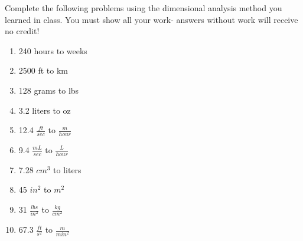 \documentclass[12pt]{article} %
\date{}
\begin{document}
\thispagestyle{fancy}
\noindent
Complete the following problems using the dimensional analysis method you learned in class. You must show all your work- answers without work will receive no credit!
\begin{enumerate}
\item 240 hours to weeks
\vspace{1.5in}
\item 2500 ft to km
\vspace{1.5in}
\item 128 grams to lbs
\vspace{1.5in}
\item 3.2 liters to oz
\vspace{1.5in}
\item 12.4 $\frac{ft}{sec}$ to $\frac{m}{hour}$
\vspace{1.5in}
\item 9.4 $\frac{mL}{sec}$ to $\frac{L}{hour}$
\vspace{1.5in}
\item 7.28 $cm^3$ to liters
\vspace{1.5in}
\item 45 $in^2$ to $m^2$
\vspace{1.5in}
\item 31 $\frac{lbs}{in^2}$ to $\frac{kg}{cm^2}$
\vspace{1.5in}
\item 67.3 $\frac{ft}{s^2}$ to $\frac{m}{min^2}$
\end{enumerate}
\end{document}
